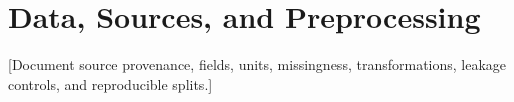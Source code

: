 \section{Data, Sources, and Preprocessing}
[Document source provenance, fields, units, missingness, transformations, leakage controls, and reproducible splits.]
